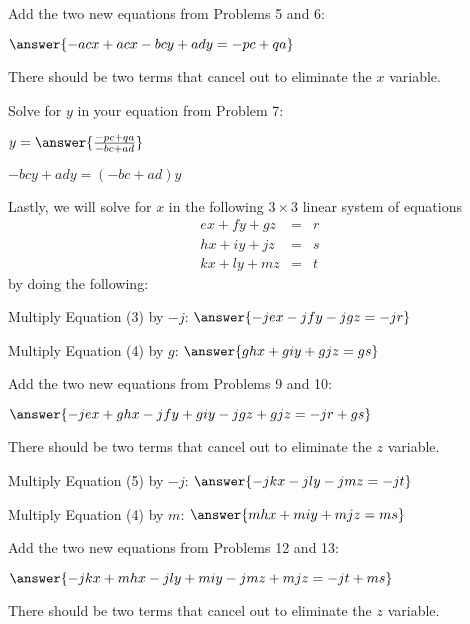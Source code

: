 \documentclass[number]{ximera}
\begin{document}
\begin{problem}
Add the two new equations from Problems 5 and 6:

$\answer{-acx+acx -bcy+ady=-pc+qa}$
\begin{hint}There should be two terms that cancel out to eliminate the $x$ variable.\end{hint}
\end{problem}

\begin{problem}
Solve for $y$ in your equation from Problem 7:

$y=\answer{\frac{-pc+qa}{-bc+ad}}$
\begin{hint}
$-bcy+ady=(-bc+ad)y$
\end{hint}
\end{problem}


Lastly, we will solve for $x$ in the following $3\times3$ linear system of equations
\begin{eqnarray}
ex+fy+gz&=&r\\
hx+iy+jz&=&s\\
kx+ly+mz&=&t
\end{eqnarray}
by doing the following:

\begin{problem}
Multiply Equation (3) by $-j$: $\answer{-jex-jfy-jgz=-jr}$
\end{problem}

\begin{problem}
Multiply Equation (4) by $g$: $\answer{ghx+giy+gjz=gs}$
\end{problem}

\begin{problem}
Add the two new equations from Problems 9 and 10:

$\answer{-jex+ghx-jfy+giy-jgz+gjz=-jr+gs}$
\begin{hint} There should be two terms that cancel out to eliminate the $z$ variable.\end{hint}
\end{problem}

\begin{problem}
Multiply Equation (5) by $-j$: $\answer{-jkx-jly-jmz=-jt}$
\end{problem}

\begin{problem}
Multiply Equation (4) by $m$: $\answer{mhx+miy+mjz=ms}$
\end{problem}

\begin{problem}
Add the two new equations from Problems 12 and 13:

$\answer{-jkx+mhx-jly+miy-jmz+mjz=-jt+ms}$
\begin{hint} There should be two terms that cancel out to eliminate the $z$ variable.\end{hint}
\end{problem}
\end{document}

